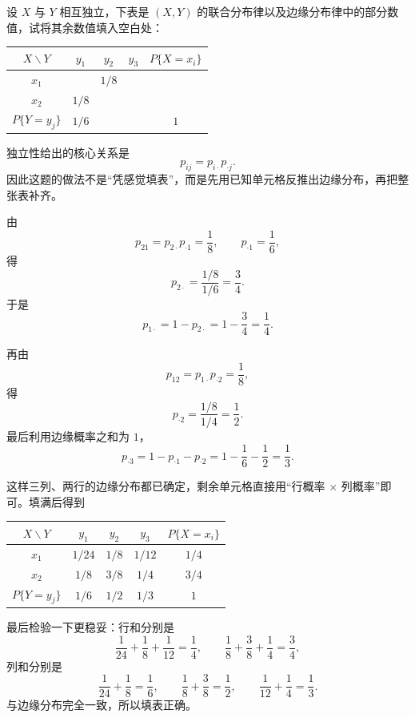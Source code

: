 ﻿\documentclass[lang=cn,11pt]{elegantbook}
\begin{document}
\begin{exercise}[独立性填表] \label{exer:3-c7}
设 $X$ 与 $Y$ 相互独立，下表是 $(X,Y)$ 的联合分布律以及边缘分布律中的部分数值，试将其余数值填入空白处：
\begin{center}
\begin{tabular}{c|ccc|c}
\toprule
$X \backslash Y$ & $y_1$ & $y_2$ & $y_3$ & $P\{X=x_i\}$ \\
\midrule
$x_1$ & & $1/8$ & & \\
$x_2$ & $1/8$ & & & \\
\midrule
$P\{Y=y_j\}$ & $1/6$ & & & $1$ \\
\bottomrule
\end{tabular}
\end{center}
\end{exercise}
\begin{solution}
独立性给出的核心关系是
\[
p_{ij}=p_{i\cdot}p_{\cdot j}.
\]
因此这题的做法不是“凭感觉填表”，而是先用已知单元格反推出边缘分布，再把整张表补齐。

由
\[
p_{21}=p_{2\cdot}p_{\cdot 1}=\frac{1}{8},
\qquad
p_{\cdot 1}=\frac{1}{6},
\]
得
\[
p_{2\cdot}=\frac{1/8}{1/6}=\frac{3}{4}.
\]
于是
\[
p_{1\cdot}=1-p_{2\cdot}=1-\frac{3}{4}=\frac{1}{4}.
\]

再由
\[
p_{12}=p_{1\cdot}p_{\cdot 2}=\frac{1}{8},
\]
得
\[
p_{\cdot 2}=\frac{1/8}{1/4}=\frac{1}{2}.
\]
最后利用边缘概率之和为 $1$，
\[
p_{\cdot 3}=1-p_{\cdot 1}-p_{\cdot 2}=1-\frac{1}{6}-\frac{1}{2}=\frac{1}{3}.
\]

这样三列、两行的边缘分布都已确定，剩余单元格直接用“行概率 $\times$ 列概率”即可。填满后得到
\begin{center}
\begin{tabular}{c|ccc|c}
\toprule
$X \backslash Y$ & $y_1$ & $y_2$ & $y_3$ & $P\{X=x_i\}$ \\
\midrule
$x_1$ & $1/24$ & $1/8$ & $1/12$ & $1/4$ \\[4pt]
$x_2$ & $1/8$ & $3/8$ & $1/4$ & $3/4$ \\
\midrule
$P\{Y=y_j\}$ & $1/6$ & $1/2$ & $1/3$ & $1$ \\
\bottomrule
\end{tabular}
\end{center}
最后检验一下更稳妥：行和分别是
\[
\frac{1}{24}+\frac{1}{8}+\frac{1}{12}=\frac{1}{4},\qquad
\frac{1}{8}+\frac{3}{8}+\frac{1}{4}=\frac{3}{4},
\]
列和分别是
\[
\frac{1}{24}+\frac{1}{8}=\frac{1}{6},\qquad
\frac{1}{8}+\frac{3}{8}=\frac{1}{2},\qquad
\frac{1}{12}+\frac{1}{4}=\frac{1}{3}.
\]
与边缘分布完全一致，所以填表正确。
\end{solution}
\end{document}
